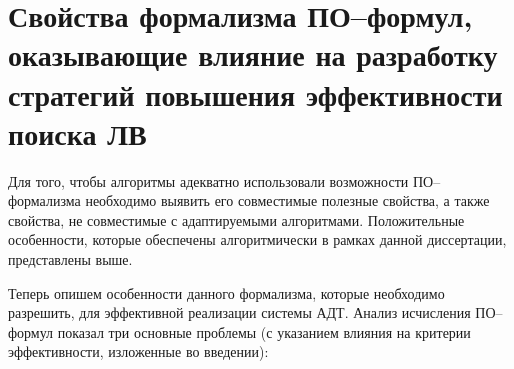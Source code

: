 \section{Свойства формализма ПО--формул, оказывающие влияние на разработку стратегий повышения эффективности поиска ЛВ}
Для того, чтобы алгоритмы адекватно использовали возможности ПО--формализма необходимо выявить его совместимые полезные свойства, а также свойства, не совместимые с адаптируемыми алгоритмами.  Положительные особенности, которые обеспечены алгоритмически в рамках данной диссертации, представлены выше.

Теперь опишем особенности данного формализма, которые необходимо разрешить, для эффективной реализации системы АДТ.
Анализ исчисления ПО--формул показал три основные проблемы (с указанием влияния на критерии эффективности, изложенные во введении):
